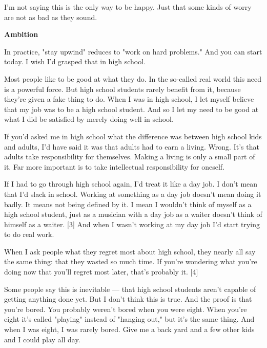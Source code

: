 I'm not saying this is
                  the only way to be happy. Just that some kinds of worry are
                  not as bad as they sound.

\textbf{Ambition}

In practice, "stay upwind" reduces to "work on
                  hard problems." And you can start today. I wish I'd grasped
                  that in high school.

Most people like to be good at
                  what they do. In the so-called real world this need is a
                  powerful force. But high school students rarely benefit from
                  it, because they're given a fake thing to do. When I was in
                  high school, I let myself believe that my job was to be a high
                  school student. And so I let my need to be good at what I did
                  be satisfied by merely doing well in school.

If
                  you'd asked me in high school what the difference was between
                  high school kids and adults, I'd have said it was that adults
                  had to earn a living. Wrong. It's that adults take
                  responsibility for themselves. Making a living is only a small
                  part of it. Far more important is to take intellectual
                  responsibility for oneself.

If I had to go through
                  high school again, I'd treat it like a day job. I don't mean
                  that I'd slack in school. Working at something as a day job
                  doesn't mean doing it badly. It means not being defined by it.
                  I mean I wouldn't think of myself as a high school student,
                  just as a musician with a day job as a waiter doesn't think of
                  himself as a waiter. [3] And when I wasn't working at my day
                  job I'd start trying to do real work.

When I ask
                  people what they regret most about high school, they nearly
                  all say the same thing: that they wasted so much time. If
                  you're wondering what you're doing now that you'll regret most
                  later, that's probably it. [4]

Some people say this
                  is inevitable --- that high school students aren't capable
                  of getting anything done yet. But I don't think this is true.
                  And the proof is that you're bored. You probably weren't bored
                  when you were eight. When you're eight it's called "playing"
                  instead of "hanging out," but it's the same thing. And when I
                  was eight, I was rarely bored. Give me a back yard and a few
                  other kids and I could play all day.

